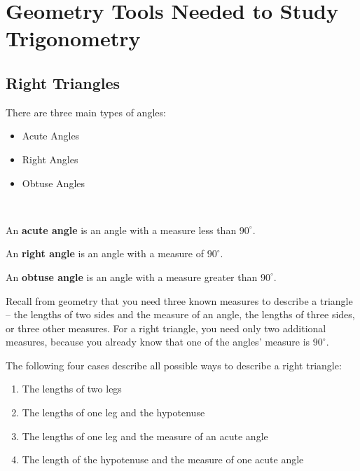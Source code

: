 \chapter{Geometry Tools Needed to Study Trigonometry}
\label{chap:geometry_tools_needed_to_study_trigonometry}

\section{Right Triangles}
\label{sec:right_triangles}

There are three main types of angles:

\begin{itemize}
  \label{item:three_main_types_of_angles}

  \item Acute Angles
  \item Right Angles
  \item Obtuse Angles
\end{itemize}

\begin{definition}[Angles]
  \label{def:angles}$ $

  An \textbf{acute angle} is an angle with a measure less than $90^{\circ}$.

  An \textbf{right angle} is an angle with a measure of $90^{\circ}$.

  An \textbf{obtuse angle} is an angle with a measure greater than
  $90^{\circ}$.
\end{definition}

Recall from geometry that you need three known measures to describe a triangle
-- the lengths of two sides and the measure of an angle, the lengths of three
sides, or three other measures. For a right triangle, you need only two
additional measures, because you already know that one of the angles' measure
is $90^{\circ}$.

The following four cases describe all possible ways to describe a right triangle:

\begin{enumerate}
  \label{enum:four_ways_to_describe_a_right_triangle}

  \item The lengths of two legs
  \item The lengths of one leg and the hypotenuse
  \item The lengths of one leg and the measure of an acute angle
  \item The length of the hypotenuse and the measure of one acute angle
\end{enumerate}

